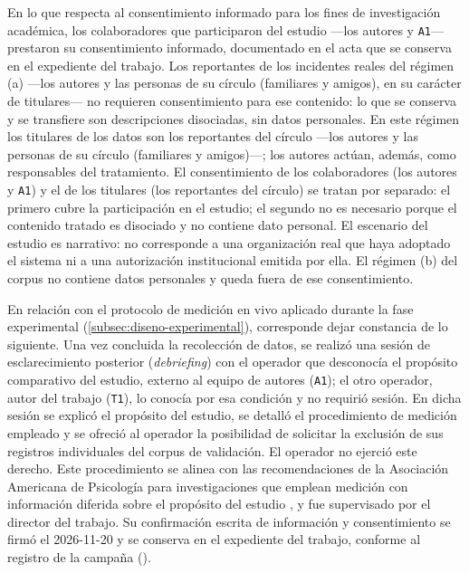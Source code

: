 En lo que respecta al consentimiento informado para los fines de investigación académica, los colaboradores que participaron del estudio ---los autores y \texttt{A1}--- prestaron su consentimiento informado, documentado en el acta que se conserva en el expediente del trabajo. Los reportantes de los incidentes reales del régimen (a) ---los autores y las personas de su círculo (familiares y amigos), en su carácter de titulares--- no requieren consentimiento para ese contenido: lo que se conserva y se transfiere son descripciones disociadas, sin datos personales. En este régimen los titulares de los datos son los reportantes del círculo ---los autores y las personas de su círculo (familiares y amigos)---; los autores actúan, además, como responsables del tratamiento. El consentimiento de los colaboradores (los autores y \texttt{A1}) y el de los titulares (los reportantes del círculo) se tratan por separado: el primero cubre la participación en el estudio; el segundo no es necesario porque el contenido tratado es disociado y no contiene dato personal. El escenario del estudio es narrativo: no corresponde a una organización real que haya adoptado el sistema ni a una autorización institucional emitida por ella. El régimen (b) del corpus no contiene datos personales y queda fuera de ese consentimiento.

En relación con el protocolo de medición en vivo aplicado durante la fase experimental (\autoref{subsec:diseno-experimental}), corresponde dejar constancia de lo siguiente. Una vez concluida la recolección de datos, se realizó una sesión de esclarecimiento posterior (\textit{debriefing}) con el operador que desconocía el propósito comparativo del estudio, externo al equipo de autores (\texttt{A1}); el otro operador, autor del trabajo (\texttt{T1}), lo conocía por esa condición y no requirió sesión. En dicha sesión se explicó el propósito del estudio, se detalló el procedimiento de medición empleado y se ofreció al operador la posibilidad de solicitar la exclusión de sus registros individuales del corpus de validación. El operador no ejerció este derecho. Este procedimiento se alinea con las recomendaciones de la Asociación Americana de Psicología para investigaciones que emplean medición con información diferida sobre el propósito del estudio \parencite{APA2017}, y fue supervisado por el director del trabajo. Su confirmación escrita de información y consentimiento se firmó el 2026-11-20 y se conserva en el expediente del trabajo, conforme al registro de la campaña ().

